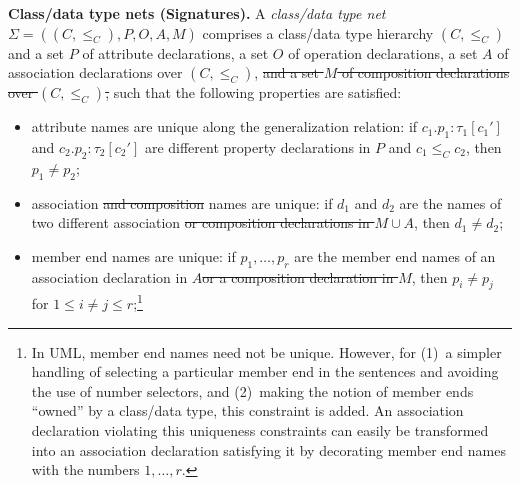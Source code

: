 \documentclass[10pt,fleqn,final]{scrreprt}
\newenvironment{definitions}[0]{\medskip }{}
\providecommand{\DIFadd}[1]{{\protect\color{blue}\uwave{#1}}} %
\providecommand{\DIFdel}[1]{{\protect\color{red}\sout{#1}}}                      %
\providecommand{\DIFaddbegin}{} %
\providecommand{\DIFaddend}{} %
\providecommand{\DIFdelbegin}{} %
\providecommand{\DIFdelend}{} %
\begin{document}
\begin{definitions}
\medskip\noindent\textbf{Class/data type nets (Signatures).}
A \emph{class/data type net} \DIFdelbegin \DIFdel{$\Sigma = ((C, {\leq_C}), P, O, A, M)$
}\DIFdelend \DIFaddbegin \DIFadd{$\Sigma = ((C, {\leq_C}), P, O, A)$
}\DIFaddend comprises a class/data type hierarchy $(C, {\leq_C})$ and a set $P$ of
attribute declarations, a set $O$ of operation declarations,
 \DIFaddbegin \DIFadd{and }\DIFaddend a set $A$ of association declarations over
$(C, {\leq_C})$, \DIFdelbegin \DIFdel{and a set $M$ of composition declarations over $(C, {\leq_C})$, }\DIFdelend such that
the following properties are satisfied:
%
\begin{itemize}[label={--}, leftmargin=*]
  \item attribute names are unique along the generalization relation: if
$c_1.p_1 : \tau_1[c_1']$ and $c_2.p_2 : \tau_2[c_2']$ are different
property declarations in $P$ and $c_1 \leq_C c_2$, then $p_1 \neq
p_2$;

  \item association \DIFdelbegin \DIFdel{and composition }\DIFdelend names are unique: if $d_1$
and $d_2$
are the names of two different association \DIFdelbegin \DIFdel{or composition
declarations in $M \cup A$}\DIFdelend \DIFaddbegin \DIFadd{declarations in $A$}\DIFaddend ,
then $d_1 \neq d_2$;

  \item member end names are unique: if $p_1, \ldots, p_r$
are the member end names of an association declaration in $A$\DIFdelbegin \DIFdel{or a composition
declaration in $M$}\DIFdelend ,
then $p_i \neq p_j$
for $1 \leq i \neq j \leq r$;\footnote{In
  UML, member end names need not be unique.  However, for (1)~a simpler
  handling of selecting a particular member end in the sentences and
  avoiding the use of number selectors, and (2)~making the notion of
  member ends ``owned'' by a class/data type, this constraint is
  added. An association declaration violating this uniqueness
  constraints can easily be transformed into an association declaration
  satisfying it by decorating member end names with the numbers
  \DIFdelbegin \DIFdel{$1,\ldots,r$}\DIFdelend \DIFaddbegin \DIFadd{$1, \ldots, r$}\DIFaddend .}


\end{itemize}
\end{definitions}
\end{document}
